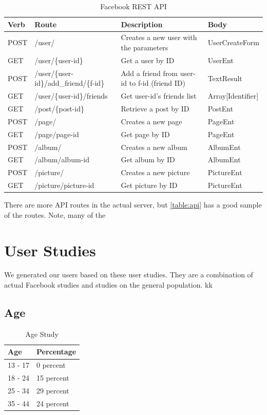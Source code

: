 \documentclass{article}
\begin{document}
\begin{table}[H]
\centering
\begin{tabular}{|p{1cm}|p{5.5cm}|p{5.5cm}|p{2.53cm}|} 
 \hline
 Verb  & Route & Description  & Body\\ [0.5ex] \hline\hline
 POST  & /user/ & Creates a new user with the parameters & UserCreateForm\\ \hline
 GET & /user/\{user-id\} & Get a user by ID & UserEnt \\ \hline
 POST & /user/\{user-id\}/add\_friend/\{f-id\} & Add a friend from user-id to f-id (friend ID) & TextResult \\ \hline
 GET & /user/\{user-id\}/friends & Get user-id's friends list & Array[Identifier] \\ \hline
 GET & /post/\{post-id\} & Retrieve a post by ID  & PostEnt \\ [1ex] \hline
 POST & /page/ & Creates a new page & PageEnt \\ [1ex] \hline
 GET & /page/{page-id} & Get page by ID & PageEnt \\ [1ex] \hline
 POST & /album/ & Creates a new album & AlbumEnt \\ [1ex] \hline
 GET & /album/{album-id} & Get album by ID & AlbumEnt \\ [1ex] \hline
 POST & /picture/ & Creates a new picture & PictureEnt \\ [1ex] \hline
 GET & /picture/{picture-id} & Get picture by ID & PictureEnt \\ [1ex] \hline
\end{tabular}
\caption{Facebook REST API}
\label{table:api}
\end{table}

There are more API routes in the actual server, but \autoref{table:api} has a good sample of the routes. Note, many of the 

\section*{User Studies}
We generated our users based on these user studies. They are a combination of actual Facebook studies and studies on the general population.
kk
\subsection*{Age}
\begin{table}[H]
\centering
\begin{tabular}{|p{2cm}||p{2cm}|} 
 \hline
 Age & Percentage \\ [0.5ex] 
 \hline\hline
 13 - 17 & 0 percent \\
 \hline
 18 - 24 & 15 percent \\
 \hline
 25 - 34 & 29 percent \\
 \hline
 35 - 44 & 24 percent \\ [1ex] 
 \hline
\end{tabular}
\caption{Age Study \cite{sproutsocialwebsite}}
\label{table:1}
\end{table}
\end{document}
